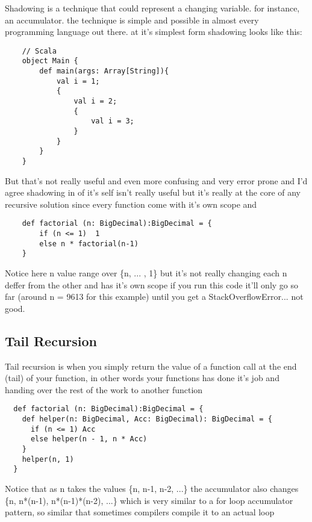 \documentclass[conference]{IEEEtran}
\begin{document}
Shadowing is a technique that could represent a changing variable. for instance, an accumulator. the technique is simple and possible in almost every programming language out there.
at it's simplest form shadowing looks like this:
\begin{lstlisting}
    // Scala  
    object Main {
        def main(args: Array[String]){
            val i = 1;
            {
                val i = 2;
                {
                    val i = 3;
                }
            }
        }  
    }    
\end{lstlisting}
But that's not really useful and even more confusing and very error prone and I'd agree shadowing in of it's self isn't really useful but it's really at the core of any recursive solution since every function come with it's own scope and 
\begin{lstlisting} 
    def factorial (n: BigDecimal):BigDecimal = {
        if (n <= 1)  1
        else n * factorial(n-1)
    }
\end{lstlisting}
Notice here n value range over \{n, ... , 1\} but it's not really changing each n deffer from the other and has it's own scope
if you run this code it'll only go so far (around  n = 9613 for this example) until you get a StackOverflowError... not good.

\subsection{Tail Recursion}
Tail recursion is when you simply return the value of a function call at the end (tail) of your function, in other words your functions has done it's job and handing over the rest of the work to another function
\begin{lstlisting}
  def factorial (n: BigDecimal):BigDecimal = {
    def helper(n: BigDecimal, Acc: BigDecimal): BigDecimal = {
      if (n <= 1) Acc
      else helper(n - 1, n * Acc)
    }
    helper(n, 1)
  }
\end{lstlisting}
Notice that as n takes the values \{n, n-1, n-2, ...\}
the accumulator also changes \{n, n*(n-1), n*(n-1)*(n-2), ...\}
which is very similar to a for loop accumulator pattern, so similar that sometimes compilers compile it to an actual loop
\end{document}
